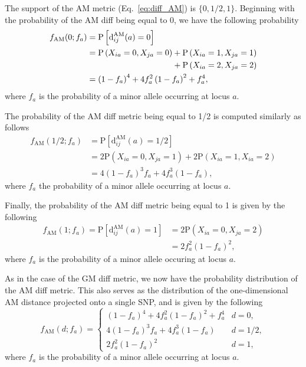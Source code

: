 \documentclass[aoas]{imsart}
\begin{document}
The support of the AM metric (Eq.~\ref{eq:diff_AM}) is $\{0,1/2,1\}$. Beginning with the probability of the AM diff being equal to 0, we have the following probability
%
\begin{equation}\label{eq:probAM0}
\begin{aligned}
f_\text{AM}(0;f_a) &= \text{P}\left[\text{d}^\text{AM}_{ij}(a) = 0\right] \\
&= \text{P}\left(X_{ia}=0,X_{ja}=0\right) + \text{P}\left(X_{ia}=1,X_{ja}=1\right) \\
& \hspace{3.64cm} + \text{P}\left(X_{ia}=2,X_{ja}=2\right) \\
&= \left(1 - f_a\right)^4 + 4 f^2_a \left(1 - f_a\right)^2 + f^4_a,
\end{aligned}
\end{equation}
%
where $f_a$ is the probability of a minor allele occurring at locus $a$.

The probability of the AM diff metric being equal to 1/2 is computed similarly as follows
%
\begin{equation}\label{eq:probAM0.5}
\begin{aligned}
f_\text{AM}\left(1/2;f_a\right) &= \text{P}\left[\text{d}^\text{AM}_{ij}(a) = 1/2\right] \\
&= 2\text{P}\left(X_{ia}=0,X_{ja}=1\right) + 2\text{P}\left(X_{ia}=1,X_{ia}=2\right) \\
&= 4 \left(1 - f_a\right)^3 f_a + 4 f^3_a \left(1 - f_a\right),
\end{aligned}
\end{equation}
%
where $f_a$ the probability of a minor allele occurring at locus $a$.

Finally, the probability of the AM diff metric being equal to 1 is given by the following
%
\begin{equation}\label{eq:probAM1}
\begin{aligned}
f_\text{AM}(1;f_a) = \text{P}\left[\text{d}^\text{AM}_{ij}(a) = 1\right] &= 2 \text{P}\left(X_{ia}=0,X_{ja}=2\right) \\
&= 2 f^2_a \left(1 - f_a\right)^2,
\end{aligned}
\end{equation}
%
where $f_a$ is the probability of a minor allele occuring at locus $a$.

As in the case of the GM diff metric, we now have the probability distribution of the AM diff metric. This also serves as the distribution of the one-dimensional AM distance projected onto a single SNP, and is given by the following
%
\begin{equation}\label{eq:AMdiffPDF}
f_\text{AM}(d;f_a) = \begin{cases}
\left(1 - f_a\right)^4 + 4 f^2_a \left(1 - f_a\right)^2 + f^4_a & d=0, \\
4 \left(1 - f_a\right)^3 f_a + 4 f^3_a \left(1 - f_a\right) & d=1/2, \\
2 f^2_a \left(1 - f_a\right)^2 & d=1,
\end{cases}
\end{equation}
%
where $f_a$ is the probability of a minor allele occurring at locus $a$.
\end{document}
